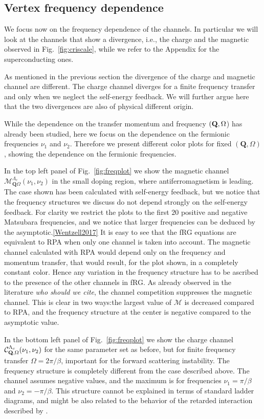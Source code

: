 \subsection{Vertex frequency dependence}

We focus now on the frequency dependence of the channels. 
In particular we will look at the channels that show a divergence, i.e., the charge and the magnetic observed in Fig.~\ref{fig:criscale}, while we refer to the Appendix for the superconducting ones.

As mentioned in the previous section the divergence of the charge and magnetic channel are different. The charge channel diverges for a finite frequency transfer and only when we neglect the self-energy feedback. 
We will further argue here that the two divergences are also of physical different origin.  

While the dependence on the transfer momentum and frequency $(\mathbf{Q},\Omega$) has already been studied, here we focus on the dependence on the fermionic frequencies $\nu_1$ and $\nu_2$. 
Therefore we present different color plots for fixed  $(\mathbf{Q},\Omega)$, showing the dependence on the fermionic frequencies. 
 
In the top left panel of Fig.~\ref{fig:freqplot} we show the magnetic channel $\mathcal{M}^{\Lambda_c}_{\mathbf{Q}\Omega}(\nu_1,\nu_2)$ in the small doping region, where antiferromagnetism is leading. 
The case shown has been calculated with self-energy feedback, but we notice that the frequency structures we discuss do not depend strongly on the self-energy feedback. For clarity we restrict the plots to the first $20$ positive and negative Matsubara frequencies, and we notice that larger frequencies can be deduced by the asymptotic.\ref{Wentzell2017}
It is easy to see that the fRG equations are equivalent to RPA when only one channel is taken into account. 
The magnetic channel calculated with RPA would depend only on the frequency and momentum transfer, that would result, for the plot shown, in a completely constant color.
Hence any variation in the frequency structure has to be ascribed to the presence of the other channels in fRG.
As already observed in the literature \textit{who should we cite}, the channel competition suppresses the magnetic channel. 
This is clear in two ways:the largest value of $\mathcal{M}$ is decreased compared to RPA, and the frequency structure at the center is negative compared to the asymptotic value. 

In the bottom left panel of Fig.~\ref{fig:freqplot} we show the charge channel $\mathcal{C}^{\Lambda_c}_{\mathbf{Q},\Omega}(\nu_1,\nu_2)$ for the same parameter set as before, but for finite frequency transfer $\Omega=2\pi/\beta$, important for the forward scattering instability. 
The frequency structure is completely different from the case described above. 
The channel assumes negative values, and the maximum is for frequencies $\nu_1 = \pi/\beta$ and $\nu_2=-\pi/\beta$. 
This structure cannot be explained in terms of standard ladder diagrams, and might be also related to the behavior of the retarded interaction described by \cite{Stepanov2016}. 

